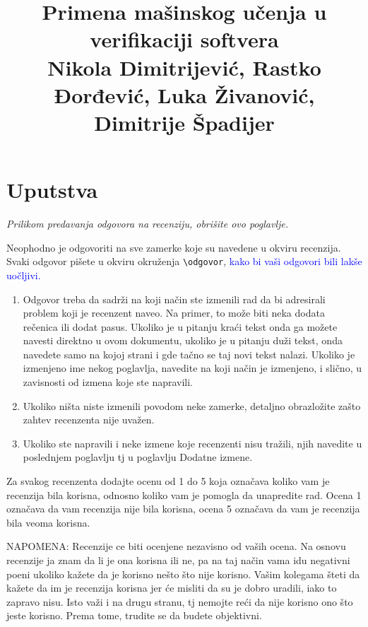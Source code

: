 \documentclass[a4paper]{report}
\newcommand{\odgovor}[1]{\textcolor{blue}{#1}}
\begin{document}
\title{Primena mašinskog učenja u verifikaciji softvera\\ \small{Nikola Dimitrijević, Rastko Đorđević, Luka Živanović, Dimitrije Špadijer}}

\maketitle

\tableofcontents

\chapter{Uputstva}
\emph{Prilikom predavanja odgovora na recenziju, obrišite ovo poglavlje.}

Neophodno je odgovoriti na sve zamerke koje su navedene u okviru recenzija. Svaki odgovor pišete u okviru okruženja \verb"\odgovor", \odgovor{kako bi vaši odgovori bili lakše uočljivi.}
\begin{enumerate}

\item Odgovor treba da sadrži na koji način ste izmenili rad da bi adresirali problem koji je recenzent naveo. Na primer, to može biti neka dodata rečenica ili dodat pasus. Ukoliko je u pitanju kraći tekst onda ga možete navesti direktno u ovom dokumentu, ukoliko je u pitanju duži tekst, onda navedete samo na kojoj strani i gde tačno se taj novi tekst nalazi. Ukoliko je izmenjeno ime nekog poglavlja, navedite na koji način je izmenjeno, i slično, u zavisnosti od izmena koje ste napravili.

\item Ukoliko ništa niste izmenili povodom neke zamerke, detaljno obrazložite zašto zahtev recenzenta nije uvažen.

\item Ukoliko ste napravili i neke izmene koje recenzenti nisu tražili, njih navedite u poslednjem poglavlju tj u poglavlju Dodatne izmene.
\end{enumerate}

Za svakog recenzenta dodajte ocenu od 1 do 5 koja označava koliko vam je recenzija bila korisna, odnosno koliko vam je pomogla da unapredite rad. Ocena 1 označava da vam recenzija nije bila korisna, ocena 5 označava da vam je recenzija bila veoma korisna.

NAPOMENA: Recenzije ce biti ocenjene nezavisno od vaših ocena. Na osnovu recenzije ja znam da li je ona korisna ili ne, pa na taj način vama idu negativni poeni ukoliko kažete da je korisno nešto što nije korisno. Vašim kolegama šteti da kažete da im je recenzija korisna jer će misliti da su je dobro uradili, iako to zapravo nisu. Isto važi i na drugu stranu, tj nemojte reći da nije korisno ono što jeste korisno. Prema tome, trudite se da budete objektivni.
\end{document}
